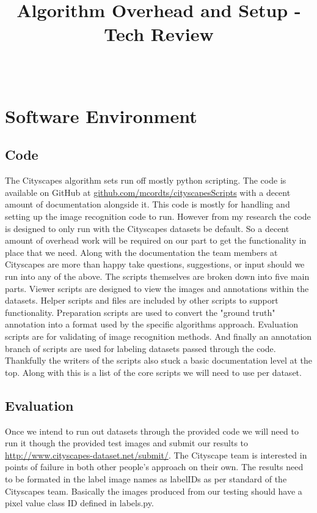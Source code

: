 \documentclass[10pt,draftclsnofoot,onecolumn,journal,compsoc]{IEEEtran}
\title{Algorithm Overhead and Setup - Tech Review}
\author{
  \IEEEauthorblockN{Team (Group 32) name: Teaching AutoPilot to Dodge\\ Tanner Fry} \\
  \IEEEauthorblockA{CS 461: Senior Capstone Fall 2016 \\ Oregon State University}
}
\date{}
\begin{document}
\maketitle
\IEEEdisplaynontitleabstractindextext
\IEEEpeerreviewmaketitle

\newpage

\tableofcontents

\newpage

\section{Software Environment}
    \subsection{Code}
	The Cityscapes algorithm sets run off mostly python scripting. The code is available on GitHub at \url{github.com/mcordts/cityscapesScripts} with a decent amount of documentation alongside it. This code is mostly for handling and setting up the image recognition code to run. However from my research the code is designed to only run with the Cityscapes datasets be default. So a decent amount of overhead work will be required on our part to get the functionality in place that we need. Along with the documentation the team members at Cityscapes are more than happy take questions, suggestions, or input should we run into any of the above.
    The scripts themselves are broken down into five main parts. Viewer scripts are designed to view the images and annotations within the datasets. Helper scripts and files are included by other scripts to support functionality. Preparation scripts are used to convert the "ground truth" annotation into a format used by the specific algorithms approach. Evaluation scripts are for validating of image recognition methods. And finally an annotation branch of scripts are used for labeling datasets passed through the code.
    Thankfully the writers of the scripts also stuck a basic documentation level at the top. Along with this is a list of the core scripts we will need to use per dataset.
    \subsection{Evaluation}
    Once we intend to run out datasets through the provided code we will need to run it though the provided test images and submit our results to \url{http://www.cityscapes-dataset.net/submit/}. The Cityscape team is interested in points of failure in both other people's approach on their own. The results need to be formated in the label image names as labelIDs as per standard of the Cityscapes team. Basically the images produced from our testing should have a pixel value class ID defined in labels.py. 
\end{document}

